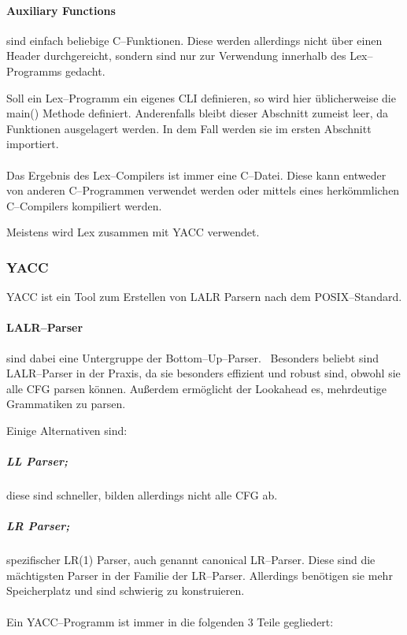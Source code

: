 \paragraph{Auxiliary Functions} sind einfach beliebige C--Funktionen.
Diese werden allerdings nicht über einen Header durchgereicht, sondern sind nur zur Verwendung innerhalb des Lex--Programms gedacht.

Soll ein Lex--Programm ein eigenes \ac{CLI} definieren, so wird hier üblicherweise die {\ttfamily main()} Methode definiert.
Anderenfalls bleibt dieser Abschnitt zumeist leer, da Funktionen ausgelagert werden.
In dem Fall werden sie im ersten Abschnitt importiert.

\paragraph*{}
Das Ergebnis des Lex--Compilers ist immer eine C--Datei.
Diese kann entweder von anderen C--Programmen verwendet werden oder mittels eines herkömmlichen C--Compilers kompiliert werden.

Meistens wird Lex zusammen mit \ac{YACC} verwendet.

\subsubsection{\acs{YACC}}
\ac{YACC} ist ein Tool zum Erstellen von \ac{LALR} Parsern nach dem \acs{POSIX}--Standard.

\paragraph{\acs{LALR}--Parser} sind dabei eine Untergruppe der Bottom--Up--Parser.~\autocite{aho-2006}
Besonders beliebt sind \acs{LALR}--Parser in der Praxis, da sie besonders effizient und robust sind, obwohl sie alle \ac{CFG} parsen können.
Außerdem ermöglicht der Lookahead es, mehrdeutige Grammatiken zu parsen.

Einige Alternativen sind:

\subparagraph{\ac{LL} Parser;} diese sind schneller, bilden allerdings nicht alle \ac{CFG} ab.

\subparagraph{\ac{LR} Parser;} spezifischer LR(1) Parser, auch genannt canonical \acs{LR}--Parser.
Diese sind die mächtigsten Parser in der Familie der \acs{LR}--Parser.
Allerdings benötigen sie mehr Speicherplatz und sind schwierig zu konstruieren.

\paragraph*{}
Ein \acs{YACC}--Programm ist immer in die folgenden 3 Teile gegliedert:~\autocite{debray-no-date}


